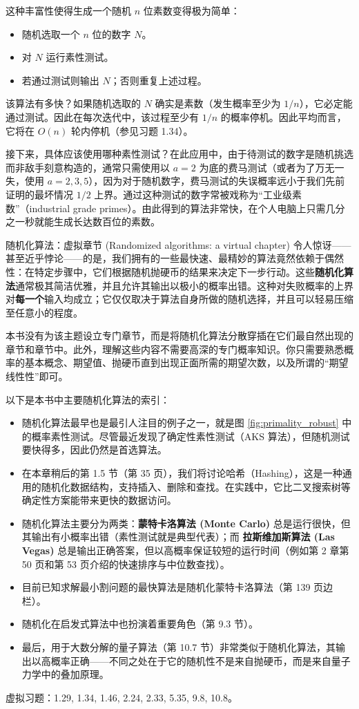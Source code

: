 这种丰富性使得生成一个随机 $n$ 位素数变得极为简单：
\begin{itemize}
    \item 随机选取一个 $n$ 位的数字 $N$。
    \item 对 $N$ 运行素性测试。
    \item 若通过测试则输出 $N$；否则重复上述过程。
\end{itemize}

该算法有多快？如果随机选取的 $N$ 确实是素数（发生概率至少为 $1/n$），它必定能通过测试。因此在每次迭代中，该过程至少有 $1/n$ 的概率停机。因此平均而言，它将在 $O(n)$ 轮内停机（参见习题 1.34）。

接下来，具体应该使用哪种素性测试？在此应用中，由于待测试的数字是随机挑选而非敌手刻意构造的，通常只需使用以 $a = 2$ 为底的费马测试（或者为了万无一失，使用 $a = 2, 3, 5$），因为对于随机数字，费马测试的失误概率远小于我们先前证明的最坏情况 $1/2$ 上界。通过这种测试的数字常被戏称为“工业级素数”（industrial grade primes）。由此得到的算法非常快，在个人电脑上只需几分之一秒就能生成长达数百位的素数。

\begin{sidebarbox}{随机化算法：虚拟章节 (Randomized algorithms: a virtual chapter)}
令人惊讶——甚至近乎悖论——的是，我们拥有的一些最快速、最精妙的算法竟然依赖于偶然性：在特定步骤中，它们根据随机抛硬币的结果来决定下一步行动。这些\textbf{随机化算法}通常极其简洁优雅，并且允许其输出以极小的概率出错。这种对失败概率的上界对\textbf{每一个}输入均成立；它仅仅取决于算法自身所做的随机选择，并且可以轻易压缩至任意小的程度。

本书没有为该主题设立专门章节，而是将随机化算法分散穿插在它们最自然出现的章节和章节中。此外，理解这些内容不需要高深的专门概率知识。你只需要熟悉概率的基本概念、期望值、抛硬币直到出现正面所需的期望次数，以及所谓的“期望线性性”即可。

以下是本书中主要随机化算法的索引：
\begin{itemize}
    \item 随机化算法最早也是最引人注目的例子之一，就是图 \ref{fig:primality_robust} 中的概率素性测试。尽管最近发现了确定性素性测试（AKS 算法），但随机测试要快得多，因此仍然是首选算法。
    \item 在本章稍后的第 1.5 节（第 35 页），我们将讨论哈希（Hashing），这是一种通用的随机化数据结构，支持插入、删除和查找。在实践中，它比二叉搜索树等确定性方案能带来更快的数据访问。
    \item 随机化算法主要分为两类：\textbf{蒙特卡洛算法 (Monte Carlo)} 总是运行很快，但其输出有小概率出错（素性测试就是典型代表）；而 \textbf{拉斯维加斯算法 (Las Vegas)} 总是输出正确答案，但以高概率保证较短的运行时间（例如第 2 章第 50 页和第 53 页介绍的快速排序与中位数查找）。
    \item 目前已知求解最小割问题的最快算法是随机化蒙特卡洛算法（第 139 页边栏）。
    \item 随机化在启发式算法中也扮演着重要角色（第 9.3 节）。
    \item 最后，用于大数分解的量子算法（第 10.7 节）非常类似于随机化算法，其输出以高概率正确——不同之处在于它的随机性不是来自抛硬币，而是来自量子力学中的叠加原理。
\end{itemize}
虚拟习题：1.29, 1.34, 1.46, 2.24, 2.33, 5.35, 9.8, 10.8。
\end{sidebarbox}

